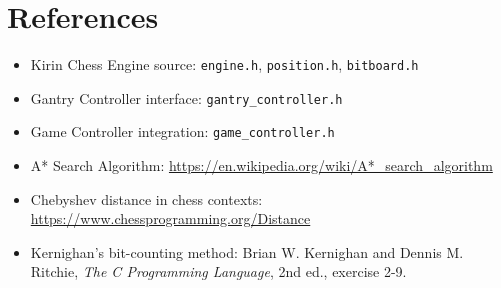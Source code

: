 \documentclass[11pt,a4paper]{report}
\begin{document}
\chapter{References}

\begin{itemize}
    \item Kirin Chess Engine source: \texttt{engine.h}, \texttt{position.h}, \texttt{bitboard.h}
    \item Gantry Controller interface: \texttt{gantry\_controller.h}
    \item Game Controller integration: \texttt{game\_controller.h}
    \item A* Search Algorithm: \url{https://en.wikipedia.org/wiki/A*_search_algorithm}
    \item Chebyshev distance in chess contexts: \url{https://www.chessprogramming.org/Distance}
    \item Kernighan's bit-counting method: Brian W. Kernighan and Dennis M. Ritchie, \textit{The C Programming Language}, 2nd ed., exercise 2-9.
\end{itemize}

\end{document}
